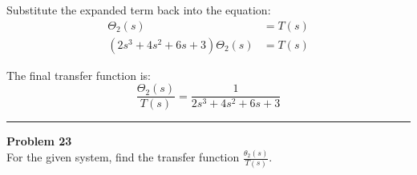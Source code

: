 \documentclass[11pt]{article}
\begin{document}
Substitute the expanded term back into the equation:
\begin{align*}
[ (2s^3 + 4s^2 + 6s + 4) - 1 ] \Theta_2(s) &= T(s) \\
(2s^3 + 4s^2 + 6s + 3) \Theta_2(s) &= T(s)
\end{align*}

The final transfer function is:
\[
\boxed{\frac{\Theta_2(s)}{T(s)} = \frac{1}{2s^3 + 4s^2 + 6s + 3}}
\]




\newpage
  \setcounter{page}{44}  
\noindent\rule{\textwidth}{1pt}
\noindent\textbf{Problem 23} \hfill 
\\ For the given system, find the transfer function $\frac{\theta_2(s)}{T(s)}$.
\end{document}
